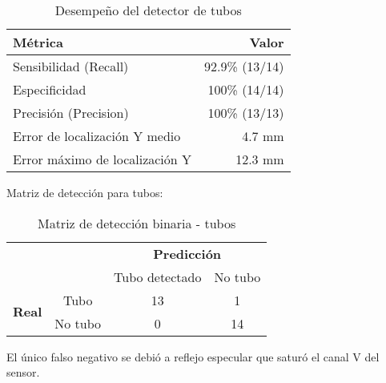 \begin{table}[H]
\centering
\begin{tabular}{|l|r|}
\hline
\textbf{Métrica} & \textbf{Valor} \\ \hline
Sensibilidad (Recall) & 92.9\% (13/14) \\ \hline
Especificidad & 100\% (14/14) \\ \hline
Precisión (Precision) & 100\% (13/13) \\ \hline
Error de localización Y medio & 4.7 mm \\ \hline
Error máximo de localización Y & 12.3 mm \\ \hline
\end{tabular}
\caption{Desempeño del detector de tubos}
\label{tab:metricas_tubos}
\end{table}

Matriz de detección para tubos:

\begin{table}[H]
\centering
\begin{tabular}{cc|c|c|}
\cline{3-4}
& & \multicolumn{2}{c|}{\textbf{Predicción}} \\ \cline{3-4}
& & Tubo detectado & No tubo \\ \hline
\multicolumn{1}{|c|}{\multirow{2}{*}{\textbf{Real}}} & Tubo & 13 & 1 \\ \cline{2-4}
\multicolumn{1}{|c|}{} & No tubo & 0 & 14 \\ \hline
\end{tabular}
\caption{Matriz de detección binaria - tubos}
\label{tab:confusion_tubos}
\end{table}

\noindent
El único falso negativo se debió a reflejo especular que saturó el canal V del sensor.
